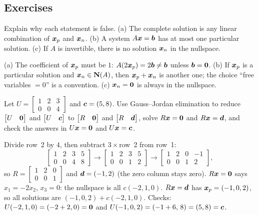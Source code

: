 \subsection{Exercises}

\begin{exercise}\label{exr:u09-false}
Explain why each statement is false. (a) The complete solution is any linear combination of
$\boldsymbol{x}_p$ and $\boldsymbol{x}_n$. (b) A system $A\boldsymbol{x}=\boldsymbol{b}$ has at most one particular solution.
(c) If $A$ is invertible, there is no solution $\boldsymbol{x}_n$ in the nullspace.
\end{exercise}
\begin{solution}
(a) The coefficient of $\boldsymbol{x}_p$ must be $1$: $A(2\boldsymbol{x}_p)=2\boldsymbol{b}\ne\boldsymbol{b}$ unless
$\boldsymbol{b}=\boldsymbol{0}$. (b) If $\boldsymbol{x}_p$ is a particular solution and $\boldsymbol{x}_n\in\mathbf{N}(A)$, then
$\boldsymbol{x}_p+\boldsymbol{x}_n$ is another one; the choice ``free variables $=0$'' is a convention.
(c) $\boldsymbol{x}_n=\boldsymbol{0}$ is always in the nullspace.
\end{solution}

\begin{exercise}\label{exr:u09-gj}
Let $U=\begin{bmatrix}1&2&3\\0&0&4\end{bmatrix}$ and $\boldsymbol{c}=(5,8)$. Use Gauss--Jordan
elimination to reduce $\begin{bmatrix}U&\boldsymbol{0}\end{bmatrix}$ and $\begin{bmatrix}U&\boldsymbol{c}\end{bmatrix}$
to $\begin{bmatrix}R&\boldsymbol{0}\end{bmatrix}$ and $\begin{bmatrix}R&\boldsymbol{d}\end{bmatrix}$, solve
$R\boldsymbol{x}=\boldsymbol{0}$ and $R\boldsymbol{x}=\boldsymbol{d}$, and check the answers in $U\boldsymbol{x}=\boldsymbol{0}$ and
$U\boldsymbol{x}=\boldsymbol{c}$.
\end{exercise}
\begin{solution}
Divide row~2 by $4$, then subtract $3\times$row~2 from row~1:
\[
\left[\begin{array}{ccc|c}1&2&3&5\\0&0&4&8\end{array}\right]\longrightarrow
\left[\begin{array}{ccc|c}1&2&3&5\\0&0&1&2\end{array}\right]\longrightarrow
\left[\begin{array}{ccc|c}1&2&0&-1\\0&0&1&2\end{array}\right],
\]
so $R=\begin{bmatrix}1&2&0\\0&0&1\end{bmatrix}$ and $\boldsymbol{d}=(-1,2)$ (the zero column stays zero).
$R\boldsymbol{x}=\boldsymbol{0}$ says $x_1=-2x_2$, $x_3=0$: the nullspace is all $c(-2,1,0)$. $R\boldsymbol{x}=\boldsymbol{d}$ has
$\boldsymbol{x}_p=(-1,0,2)$, so all solutions are $(-1,0,2)+c(-2,1,0)$. Checks:
$U(-2,1,0)=(-2+2,0)=\boldsymbol{0}$ and $U(-1,0,2)=(-1+6,\,8)=(5,8)=\boldsymbol{c}$.
\end{solution}

